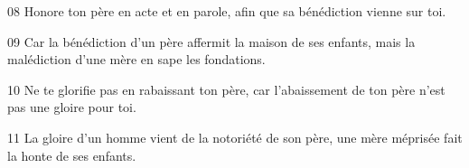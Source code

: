 
08 Honore ton père en acte et en parole, afin que sa bénédiction vienne sur toi.

09 Car la bénédiction d’un père affermit la maison de ses enfants, mais la malédiction d’une mère en sape les fondations.

10 Ne te glorifie pas en rabaissant ton père, car l’abaissement de ton père n’est pas une gloire pour toi.

11 La gloire d’un homme vient de la notoriété de son père, une mère méprisée fait la honte de ses enfants.